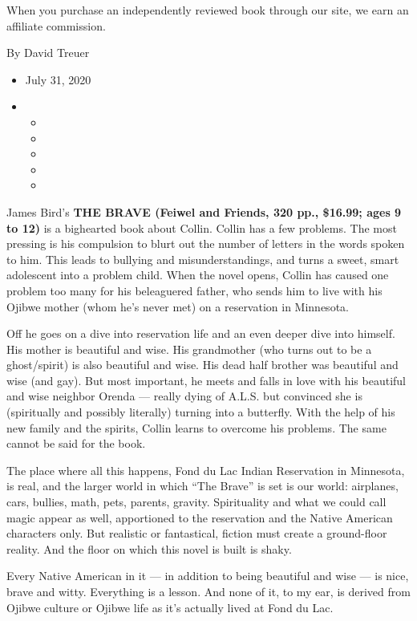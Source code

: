 When you purchase an independently reviewed book through our site, we
earn an affiliate commission.

By David Treuer

\begin{itemize}
\item
  July 31, 2020
\item
  \begin{itemize}
  \item
  \item
  \item
  \item
  \item
  \end{itemize}
\end{itemize}

James Bird's \textbf{THE BRAVE (Feiwel and Friends, 320 pp., \$16.99;
ages 9 to 12)} is a bighearted book about Collin. Collin has a few
problems. The most pressing is his compulsion to blurt out the number of
letters in the words spoken to him. This leads to bullying and
misunderstandings, and turns a sweet, smart adolescent into a problem
child. When the novel opens, Collin has caused one problem too many for
his beleaguered father, who sends him to live with his Ojibwe mother
(whom he's never met) on a reservation in Minnesota.

Off he goes on a dive into reservation life and an even deeper dive into
himself. His mother is beautiful and wise. His grandmother (who turns
out to be a ghost/spirit) is also beautiful and wise. His dead half
brother was beautiful and wise (and gay). But most important, he meets
and falls in love with his beautiful and wise neighbor Orenda --- really
dying of A.L.S. but convinced she is (spiritually and possibly
literally) turning into a butterfly. With the help of his new family and
the spirits, Collin learns to overcome his problems. The same cannot be
said for the book.

The place where all this happens, Fond du Lac Indian Reservation in
Minnesota, is real, and the larger world in which ``The Brave'' is set
is our world: airplanes, cars, bullies, math, pets, parents, gravity.
Spirituality and what we could call magic appear as well, apportioned to
the reservation and the Native American characters only. But realistic
or fantastical, fiction must create a ground-floor reality. And the
floor on which this novel is built is shaky.

Every Native American in it --- in addition to being beautiful and wise
--- is nice, brave and witty. Everything is a lesson. And none of it, to
my ear, is derived from Ojibwe culture or Ojibwe life as it's actually
lived at Fond du Lac.

